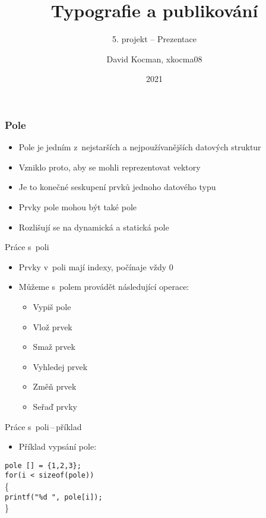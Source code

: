 \documentclass{beamer}
\title{Typografie a publikování}
\subtitle{5. projekt -- Prezentace}
\author{David Kocman, xkocma08}
\institute{FIT VUT}
\date{2021}
\begin{document}
\frame{\titlepage}

\begin{frame}
\frametitle{Pole}
    \bigskip
    \begin{itemize}
        \item Pole je jedním z~nejstarších a nejpoužívanějších datových struktur
        \item Vzniklo proto, aby se mohli reprezentovat vektory
        \item Je to konečné seskupení prvků jednoho datového typu
        \item Prvky pole mohou být také pole
        \item Rozlišují se na dynamická a statická pole
    \end{itemize}
\end{frame}
\begin{frame}{Práce s~poli}
    \begin{itemize}
        \item Prvky v~poli mají indexy, počínaje vždy 0
        \item Můžeme s~polem provádět následující operace:
        \begin{itemize}
            \item Vypiš pole
            \item Vlož prvek
            \item Smaž prvek
            \item Vyhledej prvek
            \item Změň prvek
            \item Seřaď prvky
        \end{itemize}
    \end{itemize}
\end{frame}
\begin{frame}{Práce s~poli\,--\,příklad}
    \begin{itemize}
        \item Příklad vypsání pole:
    \end{itemize}
    \bigskip
    \texttt{pole [] = \{1,2,3\};}\\
    \texttt{for(i < sizeof(pole))}\\
    \{\\
        \qquad\texttt{printf("\%d ", pole[i]);}\\
    \}
\end{frame}
\end{document}
